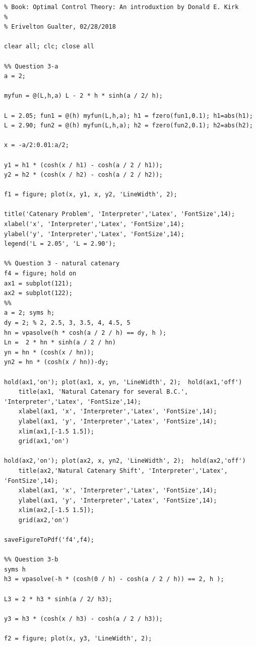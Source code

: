 \documentclass{article}
\begin{document}
\begin{lstlisting}
% Book: Optimal Control Theory: An introduxtion by Donald E. Kirk
%
% Erivelton Gualter, 02/28/2018

clear all; clc; close all

%% Question 3-a
a = 2;

myfun = @(L,h,a) L - 2 * h * sinh(a / 2/ h);
 
L = 2.05; fun1 = @(h) myfun(L,h,a); h1 = fzero(fun1,0.1); h1=abs(h1);
L = 2.90; fun2 = @(h) myfun(L,h,a); h2 = fzero(fun2,0.1); h2=abs(h2);

x = -a/2:0.01:a/2; 

y1 = h1 * (cosh(x / h1) - cosh(a / 2 / h1));
y2 = h2 * (cosh(x / h2) - cosh(a / 2 / h2));

f1 = figure; plot(x, y1, x, y2, 'LineWidth', 2); 

title('Catenary Problem', 'Interpreter','Latex', 'FontSize',14);
xlabel('x', 'Interpreter','Latex', 'FontSize',14);
ylabel('y', 'Interpreter','Latex', 'FontSize',14);
legend('L = 2.05', 'L = 2.90');

%% Question 3 - natural catenary
f4 = figure; hold on
ax1 = subplot(121); 
ax2 = subplot(122);
%% 
a = 2; syms h;
dy = 2; % 2, 2.5, 3, 3.5, 4, 4.5, 5
hn = vpasolve(h * cosh(a / 2 / h) == dy, h ); 
Ln =  2 * hn * sinh(a / 2 / hn)
yn = hn * (cosh(x / hn));
yn2 = hn * (cosh(x / hn))-dy;

hold(ax1,'on'); plot(ax1, x, yn, 'LineWidth', 2);  hold(ax1,'off')
    title(ax1, 'Natural Catenary for several B.C.', 'Interpreter','Latex', 'FontSize',14);
    xlabel(ax1, 'x', 'Interpreter','Latex', 'FontSize',14);
    ylabel(ax1, 'y', 'Interpreter','Latex', 'FontSize',14);
    xlim(ax1,[-1.5 1.5]);
    grid(ax1,'on')
    
hold(ax2,'on'); plot(ax2, x, yn2, 'LineWidth', 2);  hold(ax2,'off')
    title(ax2,'Natural Catenary Shift', 'Interpreter','Latex', 'FontSize',14);
    xlabel(ax1, 'x', 'Interpreter','Latex', 'FontSize',14);
    ylabel(ax1, 'y', 'Interpreter','Latex', 'FontSize',14);
    xlim(ax2,[-1.5 1.5]);
    grid(ax2,'on')

saveFigureToPdf('f4',f4);

%% Question 3-b
syms h
h3 = vpasolve(-h * (cosh(0 / h) - cosh(a / 2 / h)) == 2, h );

L3 = 2 * h3 * sinh(a / 2/ h3);

y3 = h3 * (cosh(x / h3) - cosh(a / 2 / h3));

f2 = figure; plot(x, y3, 'LineWidth', 2); 


\end{lstlisting}
\end{document}

